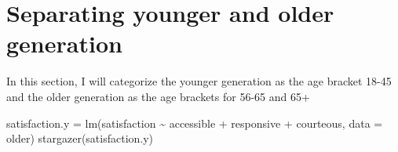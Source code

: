 \documentclass[
]{article}
\newenvironment{Shaded}{\begin{snugshade}}{\end{snugshade}}
\newcommand{\AttributeTok}[1]{\textcolor[rgb]{0.77,0.63,0.00}{#1}}
\newcommand{\FunctionTok}[1]{\textcolor[rgb]{0.00,0.00,0.00}{#1}}
\newcommand{\NormalTok}[1]{#1}
\newcommand{\OtherTok}[1]{\textcolor[rgb]{0.56,0.35,0.01}{#1}}
\newcommand{\SpecialCharTok}[1]{\textcolor[rgb]{0.00,0.00,0.00}{#1}}
\newcommand{\StringTok}[1]{\textcolor[rgb]{0.31,0.60,0.02}{#1}}
\begin{document}
\hypertarget{separating-younger-and-older-generation}{%
\section{Separating younger and older
generation}\label{separating-younger-and-older-generation}}

In this section, I will categorize the younger generation as the age
bracket 18-45 and the older generation as the age brackets for 56-65 and
65+

\begin{Shaded}
\end{Shaded}

\begin{Shaded}
\begin{Highlighting}[]
\NormalTok{satisfaction.y }\OtherTok{=} \FunctionTok{lm}\NormalTok{(satisfaction }\SpecialCharTok{\textasciitilde{}}\NormalTok{ accessible }\SpecialCharTok{+}\NormalTok{ responsive }\SpecialCharTok{+}
\NormalTok{    courteous, }\AttributeTok{data =}\NormalTok{ older)}
\FunctionTok{stargazer}\NormalTok{(satisfaction.y)}
\end{Highlighting}
\end{Shaded}
\end{document}
